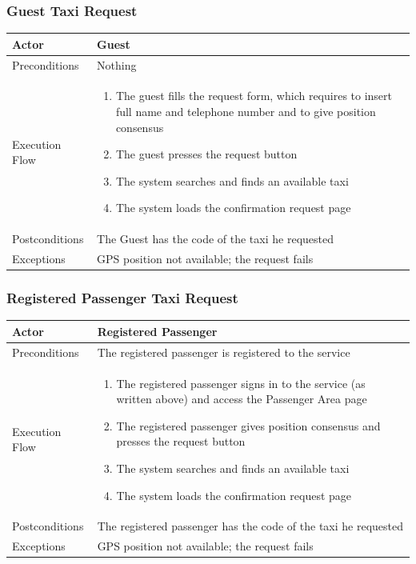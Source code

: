 		\subsubsection{Guest Taxi Request}
			\begin{center}
				\begin{tabular}{ | l | p{8cm} |}
					\hline
					Actor &  Guest	\\ \hline
					Preconditions & Nothing		\\ \hline
					Execution Flow & \begin{enumerate}
						\item The guest fills the request form, which requires to insert full name and telephone number and to give position consensus
						\item The guest presses the request button
						\item The system searches and finds an available taxi
						\item The system loads the confirmation request page
					\end{enumerate}		\\ \hline
					Postconditions & The Guest has the code of the taxi he requested	\\ \hline
					Exceptions & GPS position not available; the request fails \\ \hline
				\end{tabular}
			\end{center}
		\subsubsection{Registered Passenger Taxi Request}
			\begin{center}
				\begin{tabular}{ | l | p{8cm} |}
					\hline
					Actor &  Registered Passenger	\\ \hline
					Preconditions & The registered passenger is registered to the service	\\ \hline
					Execution Flow & \begin{enumerate}
						\item The registered passenger signs in to the service (as written above) and access the Passenger Area page
						\item The registered passenger gives position consensus and presses the request button
						\item The system searches and finds an available taxi
						\item The system loads the confirmation request page
					\end{enumerate}		\\ \hline
					Postconditions & The registered passenger has the code of the taxi he requested	\\ \hline
					Exceptions & GPS position not available; the request fails \\ \hline
				\end{tabular}
			\end{center}
